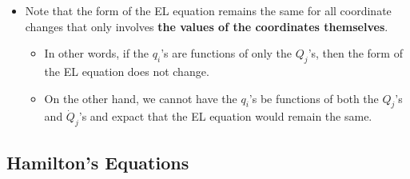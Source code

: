 \documentclass[10pt]{article}
\newcommand{\dee}{\mathrm{d}}
\begin{document}
\begin{itemize}
\begin{proof}
  		\begin{align} \label{partial-L-partial-dot-Q}
  			\frac{\dee}{\dee t} \bigg( \frac{\partial L}{\partial \dot{Q}_k} \bigg)
  			= \sum_{j=1}^f 
  			\bigg[ 
  			\frac{\dee}{\dee t} \bigg( \frac{\partial L}{\partial \dot{q}_j} \bigg) \frac{\partial q_j}{\partial Q_k}
  			+  \frac{\partial L}{\partial \dot{q}_j} \frac{\partial \dot{q}_j}{\partial Q_k}
  			\bigg]
  		\end{align}
  		Subtracing \eqref{partial-L-partial-Q} from \eqref{partial-L-partial-dot-Q}, we have that
  		\begin{align*}
  			\frac{\dee}{\dee t} \bigg( \frac{\partial L}{\partial \dot{Q}_k} \bigg) - \frac{\partial L}{\partial Q_k}
  			&= \sum_{j=1}^f \bigg[ 
  			\frac{\dee}{\dee t} \bigg( \frac{\partial L}{\partial \dot{q}_j} \bigg) \frac{\partial q_j}{\partial Q_k}
  			 -  \frac{\partial L}{\partial q_j} \frac{\partial q_j}{\partial Q_k} \bigg]
  			= \sum_{j=1}^f \bigg[ 
  			\frac{\dee}{\dee t} \bigg( \frac{\partial L}{\partial \dot{q}_j} \bigg) 
  			 -  \frac{\partial L}{\partial q_j} \bigg] \frac{\partial q_j}{\partial Q_k}
  			 = 0
  		\end{align*}
  		as required.
  	\end{proof}

  	\item Note that the form of the EL equation remains the same for all coordinate changes that only involves {\bf the values of the coordinates themselves}.
  	\begin{itemize}
  		\item In other words, if the $q_i$'s are functions of only the $Q_j$'s, then the form of the EL equation does not change.

  		\item On the other hand, we cannot have the $q_i$'s be functions of both the $Q_j$'s and $\dot{Q}_j$'s and expact that the EL equation would remain the same.
  	\end{itemize}
  \end{itemize}

  \subsection{Hamilton's Equations}
\end{document}

